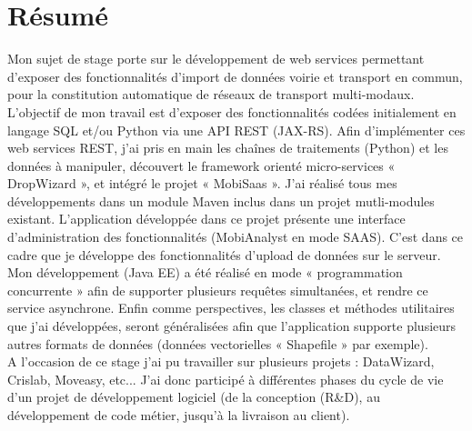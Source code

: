 \chapter*{Résumé}\label{Resume}

Mon sujet de stage porte sur le développement de web services permettant d’exposer des fonctionnalités d’import de données voirie et transport en commun, pour la constitution automatique de réseaux de transport multi-modaux. \\

L'objectif de mon travail est d'exposer des fonctionnalités codées initialement en langage SQL et/ou Python via une API REST (JAX-RS). Afin d'implémenter ces web services REST, j'ai pris en main les chaînes de traitements (Python) et les données à manipuler, découvert le framework orienté micro-services « DropWizard », et intégré le projet « MobiSaas ». J'ai réalisé tous mes développements dans un module Maven inclus dans un projet mutli-modules existant. L'application développée dans ce projet présente une interface d'administration des fonctionnalités (MobiAnalyst en mode SAAS). C'est dans ce cadre que je développe des fonctionnalités d'upload de données sur le serveur. Mon développement (Java EE) a été réalisé en mode « programmation concurrente » afin de supporter plusieurs requêtes simultanées, et rendre ce service asynchrone. Enfin comme perspectives, les classes et méthodes utilitaires que j'ai développées, seront généralisées afin que l'application supporte plusieurs autres formats de données (données vectorielles « Shapefile » par exemple).\\

A l'occasion de ce stage j'ai pu travailler sur plusieurs projets : DataWizard, Crislab, Moveasy, etc... J'ai donc participé à différentes phases du cycle de vie d'un projet de développement logiciel (de la conception (R\&D), au développement de code métier, jusqu'à la livraison au client).\\
